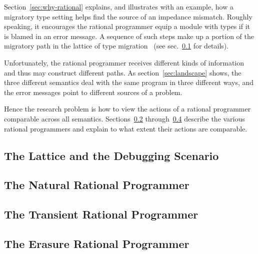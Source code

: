 
Section~\ref{sec:why-rational} explains, and illustrates with an example, how a
migratory type setting helps find the source of an impedance mismatch. Roughly
speaking, it encourages the rational programmer equip a module with types if it
is blamed in an error message. A sequence of such steps make up a portion of the
migratory path in the lattice of type migration~\cite{tfgnvf-popl-2016} (see
sec.~\ref{sub:stuff} for details). 

Unfortunately, the rational programmer receives different kinds of information
and thus may construct different paths. As section~\ref{sec:landscape} shows,
the three different semantics deal with the same program in three different
ways, and the error messages point to different sources of a problem.

Hence the research problem is how to view the actions of a rational programmer
comparable across all semantics. Sections~\ref{sub:natural}
through~\ref{sub:erasure} describe the various rational programmers and explain
to what extent their actions are comparable.

\def\rsub#1#2{\subsection{#2} \label{sub:#1} }

\rsub{stuff}     {The Lattice and the Debugging Scenario} 

\rsub{natural}   {The Natural Rational Programmer} 
\rsub{transient} {The Transient Rational Programmer} 
\rsub{erasure}   {The Erasure Rational Programmer} 
